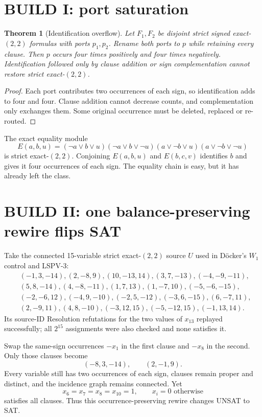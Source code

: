 \documentclass[11pt]{article}
\newtheorem{theorem}{Theorem}
\begin{document}
\section{BUILD I: port saturation}
\begin{theorem}[Identification overflow]\label{t:saturation}
Let $F_1,F_2$ be disjoint strict signed exact-$(2,2)$ formulas with ports
$p_1,p_2$. Rename both ports to $p$ while retaining every clause. Then $p$
occurs four times positively and four times negatively. Identification
followed only by clause addition or sign complementation cannot restore
strict exact-$(2,2)$.
\end{theorem}
\begin{proof}
Each port contributes two occurrences of each sign, so identification adds to
four and four. Clause addition cannot decrease counts, and complementation
only exchanges them. Some original occurrence must be deleted, replaced or
re-routed.
\end{proof}

The exact equality module
\[
E(a,b,u)=(\neg a\vee b\vee u)(\neg a\vee b\vee\neg u)
(a\vee\neg b\vee u)(a\vee\neg b\vee\neg u)
\]
is strict exact-$(2,2)$. Conjoining $E(a,b,u)$ and $E(b,c,v)$ identifies $b$
and gives it four occurrences of each sign. The equality chain is easy, but it
has already left the class.

\section{BUILD II: one balance-preserving rewire flips SAT}
Take the connected 15-variable strict exact-$(2,2)$ source $U$ used in
D\"ocker's $W_1$ control and LSPV-3:
\begin{align*}
&(-1,3,-14),(2,-8,9),(10,-13,14),(3,7,-13),(-4,-9,-11),\\
&(5,8,-14),(4,-8,-11),(1,7,13),(1,-7,10),(-5,-6,-15),\\
&(-2,-6,12),(-4,9,-10),(-2,5,-12),(-3,6,-15),(6,-7,11),\\
&(2,-9,11),(4,8,-10),(-3,12,15),(-5,-12,15),(-1,13,14).
\end{align*}
Its source-ID Resolution refutations for the two values of $x_{13}$ replayed
successfully; all $2^{15}$ assignments were also checked and none satisfies it.

Swap the same-sign occurrences $-x_1$ in the first clause and $-x_8$ in the
second. Only those clauses become
\[
(-8,3,-14),\qquad(2,-1,9).
\]
Every variable still has two occurrences of each sign, clauses remain proper
and distinct, and the incidence graph remains connected. Yet
\[
x_6=x_7=x_8=x_{10}=1,\qquad x_i=0\text{ otherwise}
\]
satisfies all clauses. Thus this occurrence-preserving rewire changes UNSAT to
SAT.
\end{document}
